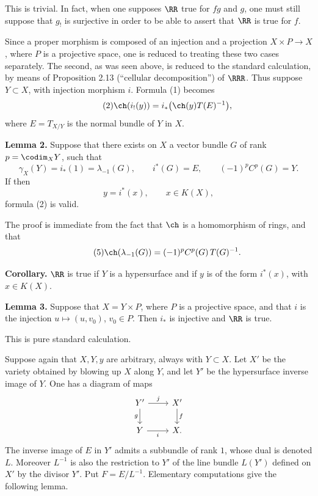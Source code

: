 This is trivial. In fact, when one supposes \(\RR\) true for \(fg\) and \(g\), one must still suppose that \(g_!\) is surjective in order to be able to assert that \(\RR\) is true for \(f\).

Since a proper morphism is composed of an injection and a projection \(X\times P\to X\), where \(P\) is a projective space, one is reduced to treating these two cases separately. The second, as was seen above, is reduced to the standard calculation, by means of Proposition 2.13 (``cellular decomposition'') of \(\RRR\). Thus suppose \(Y\subset X\), with injection morphism \(i\). Formula (1) becomes
\begin{equation}\tag{2}
  \ch(i_!(y))=i_*\bigl(\ch(y)T(E)^{-1}\bigr),
\end{equation}
where \(E=T_{X/Y}\) is the normal bundle of \(Y\) in \(X\).

\textbf{Lemma 2.} Suppose that there exists on \(X\) a vector bundle \(G\) of rank \(p=\codim_XY\), such that
\begin{equation}\tag{3}
  \gamma_X(Y)=i_*(1)=\lambda_{-1}(G),\qquad
  i^*(G)=E,\qquad
  (-1)^pC^p(G)=Y.
\end{equation}
If then
\begin{equation}\tag{4}
  y=i^*(x),\qquad x\in K(X),
\end{equation}
formula (2) is valid.

The proof is immediate from the fact that \(\ch\) is a homomorphism of rings, and that
\begin{equation}\tag{5}
  \ch(\lambda_{-1}(G))=(-1)^pC^p(G)\,T(G)^{-1}.
\end{equation}

\textbf{Corollary.} \(\RR\) is true if \(Y\) is a hypersurface and if \(y\) is of the form \(i^*(x)\), with \(x\in K(X)\).

\textbf{Lemma 3.} Suppose that \(X=Y\times P\), where \(P\) is a projective space, and that \(i\) is the injection \(u\mapsto (u,v_0)\), \(v_0\in P\). Then \(i_*\) is injective and \(\RR\) is true.

This is pure standard calculation.

Suppose again that \(X,Y,y\) are arbitrary, always with \(Y\subset X\). Let \(X'\) be the variety obtained by blowing up \(X\) along \(Y\), and let \(Y'\) be the hypersurface inverse image of \(Y\). One has a diagram of maps
\[
\begin{tikzcd}
Y' \arrow[r,"j"] \arrow[d,"g"'] & X' \arrow[d,"f"]\\
Y \arrow[r,"i"'] & X .
\end{tikzcd}
\]
The inverse image of \(E\) in \(Y'\) admits a subbundle of rank \(1\), whose dual is denoted \(L\). Moreover \(L^{-1}\) is also the restriction to \(Y'\) of the line bundle \(L(Y')\) defined on \(X'\) by the divisor \(Y'\). Put \(F=E/L^{-1}\). Elementary computations give the following lemma.

